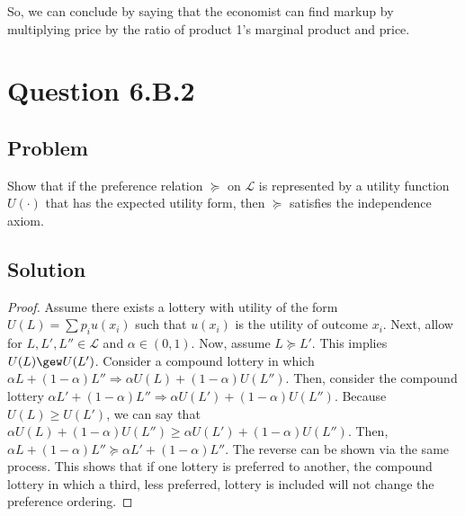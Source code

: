 \documentclass[10pt, a4paper]{article}
\begin{document}
      So, we can conclude by saying that the economist can find markup by multiplying price by the ratio of product 1's marginal product and price. 
  \section{Question 6.B.2}
    \subsection*{Problem}
      Show that if the preference relation $\succeq$ on $\mathcal{L}$ is represented by a utility function $U(\cdot)$ that has the expected utility form, then $\succeq$ satisfies the independence axiom. 
    \subsection*{Solution}
      \begin{proof}
        Assume there exists a lottery with utility of the form $U(L)=\sum p_iu(x_i)$ such that $u(x_i)$ is the utility of outcome $x_i$. Next, allow for $L, L', L''\in \mathcal{L}$ and $\alpha\in(0,1)$. Now, assume $L\succeq L'$. This implies $U(L)\gew U(L')$. Consider a compound lottery in which $\alpha L+(1-\alpha)L'' \Rightarrow \alpha U(L)+(1-\alpha)U(L'')$. Then, consider the compound lottery $\alpha L' +(1-\alpha)L''\Rightarrow \alpha U(L')+(1-\alpha)U(L'')$. Because $U(L)\geq U(L')$, we can say that $\alpha U(L)+(1-\alpha)U(L'')\geq \alpha U(L')+(1-\alpha)U(L'')$. Then, $\alpha L+(1-\alpha)L''\succeq \alpha L'+(1-\alpha) L''$. The reverse can be shown via the same process. This shows that if one lottery is preferred to another, the compound lottery in which a third, less preferred, lottery is included will not change the preference ordering.  
      \end{proof}
\end{document}
